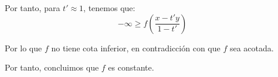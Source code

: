 \begin{ejercicio}
\begin{itemize}
        Por tanto, para $t'\approx 1$, tenemos que:
        \begin{equation*}
            -\infty \geq f\left(\frac{x-t'y}{1-t'}\right)
        \end{equation*}
    
        Por lo que $f$ no tiene cota inferior, en contradicción con que $f$ sea acotada.
    \end{itemize}

    Por tanto, concluimos que $f$ es constante.

    

    \begin{comment}
    Demostramos mediante reducción al absurdo. Suponemos que $f$ no es constante. Elegimos $b_0\in \bb{R}$ fijo, y cualquier $x\in \bb{R}$ es de la forma $x=ta + (1-t)b_0 \qquad t\in[0,1]$, para cierto $a\in \bb{R}$.

    \begin{itemize}
        \item \underline{Supuesto $a=b_0$}:
        
        \begin{equation*}
            f(x) = f(ta +(1-t)b_0) = f(ta+(1-t)b_0)  = f(b_0)
        \end{equation*}
        
        \item \underline{Supuesto $a<b_0$}:
        \begin{equation*}
            f(x) = f(ta+(1-t)b_0) \geq tf(a)+(1-t)f(b_0) 
        \end{equation*}

        Con $t\to 0$, tenemos que $f(x)\geq f(b_0)$.

        \item \underline{Supuesto $a>b_0$}:

        Realizamos el cambio de variable $s=1-t$:
        \begin{equation*}
            f(x) = f(sb_0 +(1-s)a) = f(sb_0+(1-s)a) \geq sf(b_0)+(1-s)f(a) 
        \end{equation*}

        Con $s\to 1$, tenemos que $f(x)\geq f(b_0)$.
    \end{itemize}
    
    Por tanto, tenemos que $f(x)\geq f(b_0)$.
    \end{comment}
    \begin{comment}
    \begin{itemize}
        \item \underline{Supuesto $a<b$}:
        

\end{comment}
\end{ejercicio}
